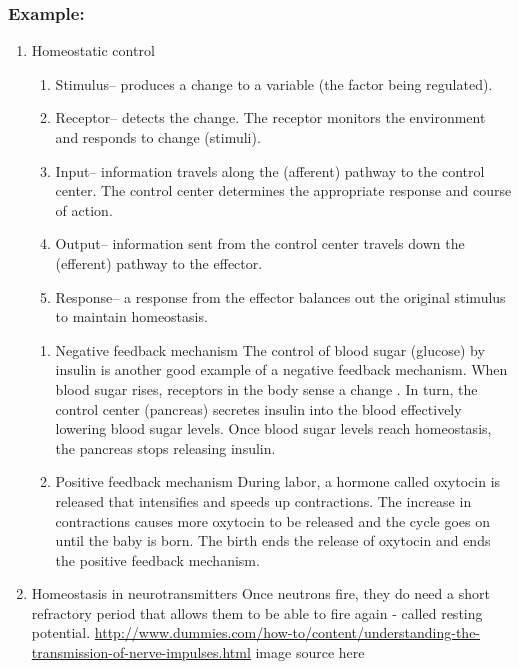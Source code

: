 \documentclass[11pt]{article}
\begin{document}
\subsubsection{Example:}
\label{sec:org6c1c573}
\begin{enumerate}
\item Homeostatic control
\label{sec:orge11dad6}
\begin{enumerate}
\item Stimulus– produces a change to a variable (the factor being regulated).
\item Receptor– detects the change. The receptor monitors the environment and responds to change (stimuli).
\item Input– information travels along the (afferent) pathway to the control center. The control center determines the appropriate response and course of action.
\item Output– information sent from the control center travels down the (efferent) pathway to the effector.
\item Response– a response from the effector balances out the original stimulus to maintain homeostasis.
\end{enumerate}

\begin{enumerate}
\item Negative feedback mechanism
\label{sec:orgf60401b}
The control of blood sugar (glucose) by insulin is another good example of a negative feedback mechanism. When blood sugar rises, receptors in the body sense a change . In turn, the control center (pancreas) secretes insulin into
the blood effectively lowering blood sugar levels. Once blood sugar levels reach homeostasis, the pancreas stops releasing insulin.

\item Positive feedback mechanism
\label{sec:orgbe3877d}
During labor, a hormone called oxytocin is released that intensifies and speeds up contractions. The increase in contractions causes more oxytocin to be released and the cycle goes on until the baby is born. The birth ends the release
of oxytocin and ends the positive feedback mechanism.
\end{enumerate}


\item Homeostasis in neurotransmitters
\label{sec:org601e87e}
Once neutrons fire, they do need a short refractory period that allows them to be able to fire again - called resting potential. \url{http://www.dummies.com/how-to/content/understanding-the-transmission-of-nerve-impulses.html} image source
here


\end{enumerate}
\end{document}
